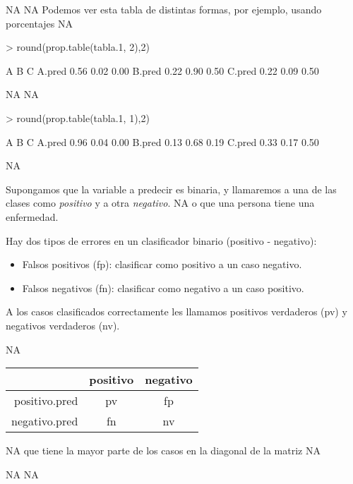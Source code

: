 \documentclass[nohyper]{tufte-handout}
\begin{document}
NA
NA
Podemos ver esta tabla de distintas formas, por ejemplo, usando porcentajes
NA
\begin{Schunk}
\begin{Sinput}
> round(prop.table(tabla.1, 2),2)
\end{Sinput}
\begin{Soutput}
          A    B    C
A.pred 0.56 0.02 0.00
B.pred 0.22 0.90 0.50
C.pred 0.22 0.09 0.50
\end{Soutput}
\end{Schunk}
NA
NA
\begin{Schunk}
\begin{Sinput}
> round(prop.table(tabla.1, 1),2)
\end{Sinput}
\begin{Soutput}
          A    B    C
A.pred 0.96 0.04 0.00
B.pred 0.13 0.68 0.19
C.pred 0.33 0.17 0.50
\end{Soutput}
\end{Schunk}


NA

Supongamos que la variable a predecir es binaria, y llamaremos
a una de las clases como {\em positivo} y a otra {\em negativo}. 
NA
o que una persona tiene una enfermedad.

\begin{shaded}
Hay dos tipos de errores en un clasificador binario (positivo - negativo):
\begin{itemize}
\item Falsos positivos (fp): clasificar como positivo a un caso negativo.
\item Falsos negativos (fn): clasificar como negativo a un caso positivo.
\end{itemize}
A los casos clasificados correctamente les llamamos positivos verdaderos (pv)
y negativos verdaderos (nv).
\end{shaded}

NA

\begin{center}
\begin{tabular}{r|cc}
 & positivo & negativo \\
 \hline
positivo.pred & pv & fp \\
negativo.pred & fn & nv \\
\end{tabular}
\end{center}

NA
que tiene la mayor parte de los casos en la diagonal de la matriz
NA

NA
NA
\end{document}
